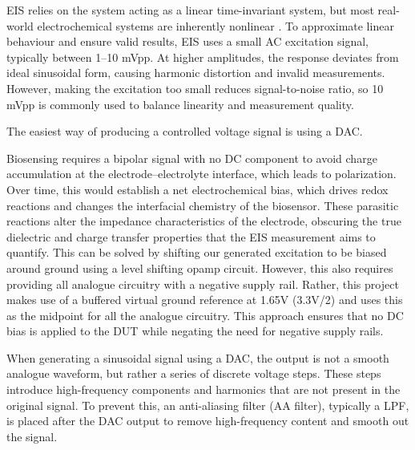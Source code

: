 \Ac{EIS} relies on the system acting as a linear time-invariant system, but most real-world electrochemical systems are inherently nonlinear \cite{ElectrochemicalMeasurementsElectrochemical}. To approximate linear behaviour and ensure valid results, EIS uses a small AC excitation signal, typically between 1–10 mVpp\cite{EISQualityIndicators}\cite{lazanasErratumElectrochemicalImpedance2025}. At higher amplitudes, the response deviates from ideal sinusoidal form, causing harmonic distortion and invalid measurements. However, making the excitation too small reduces signal-to-noise ratio, so 10 mVpp is commonly used to balance linearity and measurement quality.

The easiest way of producing a controlled voltage signal is using a \ac{DAC}.  

Biosensing requires a bipolar signal with no DC component to avoid charge accumulation at the electrode–electrolyte interface, which leads to polarization. Over time, this would establish a net electrochemical bias, which drives redox reactions and changes the interfacial chemistry of the biosensor. These parasitic reactions alter the impedance characteristics of the electrode, obscuring the true dielectric and charge transfer properties that the EIS measurement aims to quantify. This can be solved by shifting our generated excitation to be biased around ground using a level shifting opamp circuit. However, this also requires providing all analogue circuitry with a negative supply rail. Rather, this project makes use of a buffered virtual ground reference at 1.65V (3.3V/2) and uses this as the midpoint for all the analogue circuitry. This approach ensures that no DC bias is applied to the \ac{DUT} while negating the need for negative supply rails.

When generating a sinusoidal signal using a \ac{DAC}, the output is not a smooth analogue waveform, but rather a series of discrete voltage steps. These steps introduce high-frequency components and harmonics that are not present in the original signal.  To prevent this, an anti-aliasing filter (AA filter), typically a \ac{LPF}, is placed after the DAC output to remove high-frequency content and smooth out the signal.

